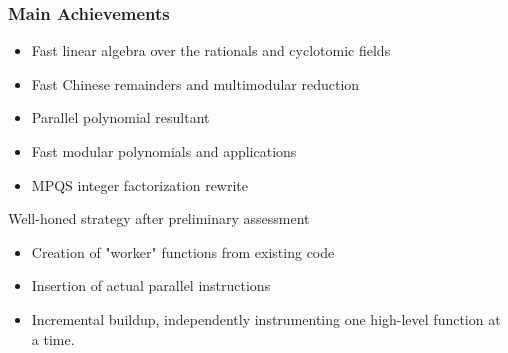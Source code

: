 \documentclass{beamer}
\begin{document}

\begin{frame} \frametitle{Main Achievements}
  \begin{itemize}
    \item  Fast linear algebra over the rationals and cyclotomic fields
    \item  Fast Chinese remainders and multimodular reduction
    \item Parallel polynomial resultant
    \item  Fast modular polynomials and applications%
     \item  MPQS integer factorization rewrite

  \end{itemize}
  \begin{block}   {Well-honed strategy after preliminary assessment}
    \begin{itemize}
    \item Creation of "worker" functions from existing code
    \item Insertion of actual parallel instructions
    \item Incremental buildup, independently instrumenting one high-level function at a time. 
    \end{itemize}
  \end{block}

\end{frame}


\end{document}
